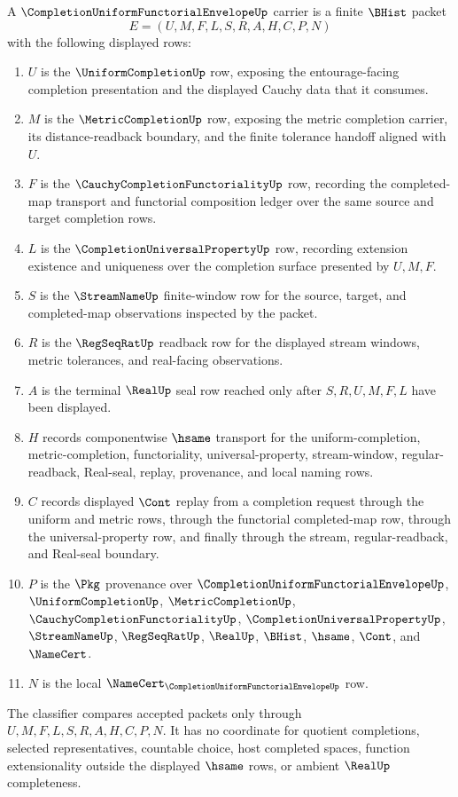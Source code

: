 \begin{definition}
\label{def:completion-uniform-functorial-envelope-carrier}
A $\CompletionUniformFunctorialEnvelopeUp$ carrier is a finite $\BHist$ packet
$$
E=(U,M,F,L,S,R,A,H,C,P,N)
$$
with the following displayed rows:
\begin{enumerate}
\item $U$ is the $\UniformCompletionUp$ row, exposing the entourage-facing completion presentation and the displayed Cauchy data that it consumes.
\item $M$ is the $\MetricCompletionUp$ row, exposing the metric completion carrier, its distance-readback boundary, and the finite tolerance handoff aligned with $U$.
\item $F$ is the $\CauchyCompletionFunctorialityUp$ row, recording the completed-map transport and functorial composition ledger over the same source and target completion rows.
\item $L$ is the $\CompletionUniversalPropertyUp$ row, recording extension existence and uniqueness over the completion surface presented by $U,M,F$.
\item $S$ is the $\StreamNameUp$ finite-window row for the source, target, and completed-map observations inspected by the packet.
\item $R$ is the $\RegSeqRatUp$ readback row for the displayed stream windows, metric tolerances, and real-facing observations.
\item $A$ is the terminal $\RealUp$ seal row reached only after $S,R,U,M,F,L$ have been displayed.
\item $H$ records componentwise $\hsame$ transport for the uniform-completion, metric-completion, functoriality, universal-property, stream-window, regular-readback, Real-seal, replay, provenance, and local naming rows.
\item $C$ records displayed $\Cont$ replay from a completion request through the uniform and metric rows, through the functorial completed-map row, through the universal-property row, and finally through the stream, regular-readback, and Real-seal boundary.
\item $P$ is the $\Pkg$ provenance over $\CompletionUniformFunctorialEnvelopeUp$, $\UniformCompletionUp$, $\MetricCompletionUp$, $\CauchyCompletionFunctorialityUp$, $\CompletionUniversalPropertyUp$, $\StreamNameUp$, $\RegSeqRatUp$, $\RealUp$, $\BHist$, $\hsame$, $\Cont$, and $\NameCert$.
\item $N$ is the local $\NameCert_{\CompletionUniformFunctorialEnvelopeUp}$ row.
\end{enumerate}
The classifier compares accepted packets only through $U,M,F,L,S,R,A,H,C,P,N$. It has no coordinate for quotient completions, selected representatives, countable choice, host completed spaces, function extensionality outside the displayed $\hsame$ rows, or ambient $\RealUp$ completeness.
\end{definition}


